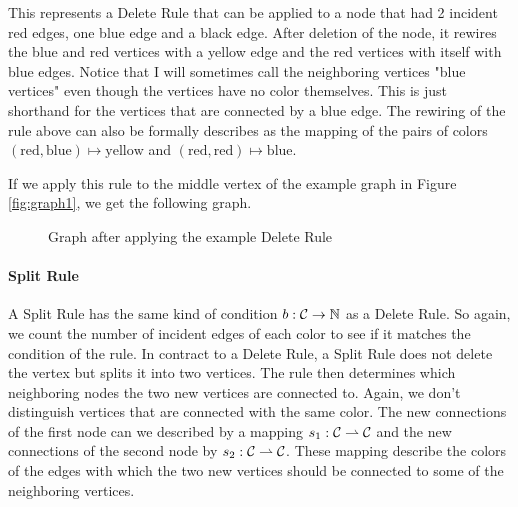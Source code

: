 This represents a Delete Rule that can be applied to a node that had 2 incident red edges, one blue edge and a black edge.
After deletion of the node, it rewires the blue and red vertices with a yellow edge and the red vertices with itself with blue edges.
Notice that I will sometimes call the neighboring vertices "blue vertices" even though the vertices have no color themselves.
This is just shorthand for the vertices that are connected by a blue edge.
The rewiring of the rule above can also be formally describes as the mapping of the pairs of colors $(\text{red}, \text{blue}) \mapsto \text{yellow}$ and $(\text{red}, \text{red}) \mapsto \text{blue}$.

If we apply this rule to the middle vertex of the example graph in Figure \ref{fig:graph1}, we get the following graph.

\begin{figure}[H]
    \label{fig:graph2}
    \centering
    \caption{Graph after applying the example Delete Rule}
\end{figure}

\paragraph*{Split Rule} A Split Rule has the same kind of condition $b : \mathcal{C} \to \mathbb{N}$ as a Delete Rule.
So again, we count the number of incident edges of each color to see if it matches the condition of the rule.
In contract to a Delete Rule, a Split Rule does not delete the vertex but splits it into two vertices.
The rule then determines which neighboring nodes the two new vertices are connected to.
Again, we don't distinguish vertices that are connected with the same color.
The new connections of the first node can we described by a mapping $s_1 : \mathcal{C} \rightharpoonup \mathcal{C}$ and the new connections of the second node by $s_2 : \mathcal{C} \rightharpoonup \mathcal{C}$.
These mapping describe the colors of the edges with which the two new vertices should be connected to some of the neighboring vertices.

